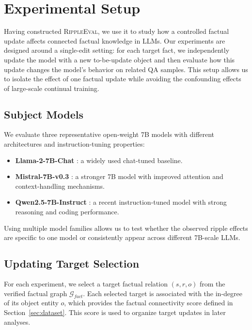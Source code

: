 \section{Experimental Setup}
\label{sec:setup}


Having constructed \textsc{RippleEval}, we use it to study how a controlled factual update affects connected factual knowledge in LLMs. Our experiments are designed around a single-edit setting: for each target fact, we independently update the model with a new to-be-update object and then evaluate how this update changes the model's behavior on related QA samples. This setup allows us to isolate the effect of one factual update while avoiding the confounding effects of large-scale continual training.

\subsection{Subject Models}

We evaluate three representative open-weight 7B models with different architectures and instruction-tuning properties:

\begin{itemize}
    \setlength\itemsep{0em}
    \item \textbf{Llama-2-7B-Chat} \cite{touvron2023llama}: a widely used chat-tuned baseline.
    \item \textbf{Mistral-7B-v0.3} \cite{jiang2023mistral}: a stronger 7B model with improved attention and context-handling mechanisms.
    \item \textbf{Qwen2.5-7B-Instruct} \cite{bai2023qwen}: a recent instruction-tuned model with strong reasoning and coding performance.
\end{itemize}

Using multiple model families allows us to test whether the observed ripple effects are specific to one model or consistently appear across different 7B-scale LLMs.

\subsection{Updating Target Selection}

For each experiment, we select a target factual relation $(s,r,o)$ from the verified factual graph $\mathcal{G}_{fact}$. Each selected target is associated with the in-degree of its object entity $o$, which provides the factual connectivity score defined in Section~\ref{sec:dataset}. This score is used to organize target updates in later analyses.

